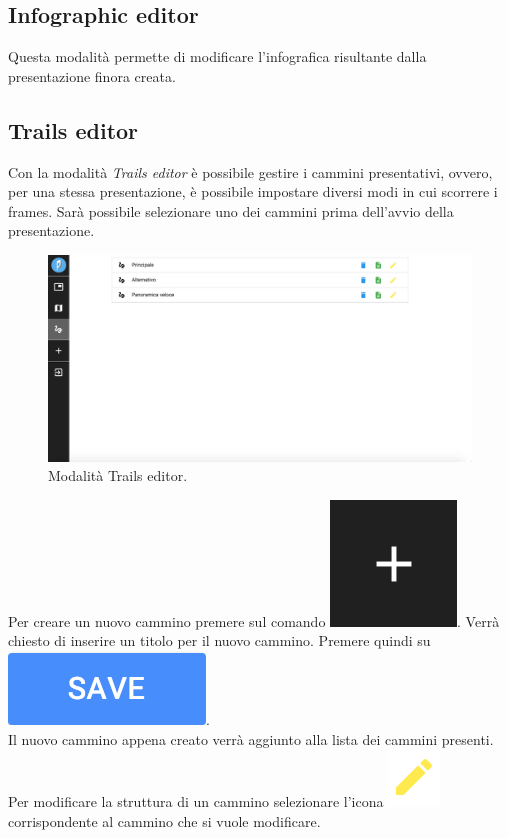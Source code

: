 \subsection{Infographic editor}
Questa modalità permette di modificare l'infografica risultante dalla presentazione finora creata.

\subsection{Trails editor}
Con la modalità \emph{Trails editor} è possibile gestire i cammini presentativi, ovvero, per una stessa presentazione, è possibile impostare diversi modi in cui scorrere i frames. Sarà possibile selezionare uno dei cammini prima dell'avvio della presentazione.\\

\begin{figure}[!h]
\begin{center}
\includegraphics[scale=0.35]{img/trails_editor_screen.png}
\caption{Modalità Trails editor.}
\end{center}
\end{figure}

Per creare un nuovo cammino premere sul comando \includegraphics[scale=0.4]{img/add_object.png}. Verrà chiesto di inserire un titolo per il nuovo cammino. Premere quindi su \includegraphics[scale=0.5]{img/save_confirm.png}.\\
Il nuovo cammino appena creato verrà aggiunto alla lista dei cammini presenti.\\
Per modificare la struttura di un cammino selezionare l'icona \includegraphics[scale=0.7]{img/edit.png} corrispondente al cammino che si vuole modificare.

